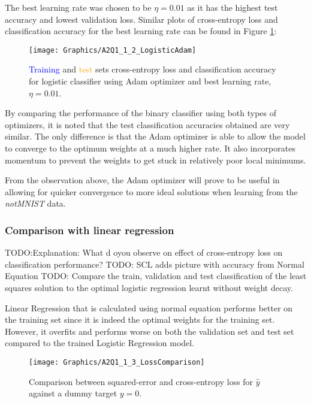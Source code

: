 \documentclass[a4paper,12pt]{article}
\begin{document}
The best learning rate was chosen to be $\eta = 0.01$ as it has the highest test accuracy and lowest validation loss. Similar plots of cross-entropy loss and classification accuracy for the best learning rate can be found in Figure \ref{figure:LogisticAdam}:

\begin{figure}[!htb]
\centering
\texttt{[image: Graphics/A2Q1\_1\_2\_LogisticAdam]}
\caption{\label{figure:LogisticAdam} \textcolor{blue}{Training} and \textcolor{orange}{test} sets cross-entropy loss and classification accuracy for logistic classifier using Adam optimizer and best learning rate, $\eta = 0.01$.}
\end{figure}

By comparing the performance of the binary classifier using both types of optimizers, it is noted that the test classification accuracies obtained are very similar. The only difference is that the Adam optimizer is able to allow the model to converge to the optimum weights at a much higher rate. It also incorporates momentum to prevent the weights to get stuck in relatively poor local minimums. 

From the observation above, the Adam optimizer will prove to be useful in allowing for quicker convergence to more ideal solutions when learning from the \textit{notMNIST} data.

\clearpage
\subsubsection{Comparison with linear regression}

TODO:Explanation: What d oyou observe on effect of cross-entropy loss on classification performance?
TODO: SCL adds picture with accuracy from Normal Equation
TODO: Compare the train, validation
and test classification of the least squares solution to the optimal logistic regression learnt without weight decay.

Linear Regression that is calculated using normal equation performs better on the training set since it is indeed the optimal weights for the training set. However, it overfits and performs worse on both the validation set and test set compared to the trained Logistic Regression model. 

\begin{figure}[!htb]
\centering
\texttt{[image: Graphics/A2Q1\_1\_3\_LossComparison]}
\caption{\label{figure:ComparingDifferentLosses} Comparison between squared-error and cross-entropy loss for $\hat{y}$ against a dummy target $y = 0$.}
\end{figure}
\end{document}
